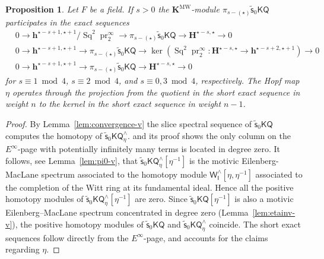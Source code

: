 \documentclass[11pt,hyp,english]{article}
\newcommand{\KQ}{\mathsf{KQ}}
\newcommand{\Sq}{\operatorname{Sq}}
\newcommand{\pr}{\operatorname{pr}}
\newcommand{\vs}{\tilde{\mathsf{s}}}
\newcommand{\KMW}{\mathbf{K}^\mathrm{MW}}
\newcommand{\bideg}{(\star)}
\newtheorem{proposition}[theorem]{Proposition}
\theoremstyle{definition}
\begin{document}
\begin{proposition}\label{thm:pi-v}
Let $F$ be a field.
If $s>0$ the $\KMW$-module $\pi_{s-\bideg}\vs_{0}\KQ $ participates in the exact sequences
\begin{align*}
& 0 \to \mathbf{h}^{\star-s+1,\star+1}/\Sq^2\pr^\infty_2 \to 
\pi_{s-\bideg}\vs_{0}\KQ  \to \mathbf{H}^{\star-s,\star} \to 0 \\
& 0 \to \mathbf{h}^{\star-s+1,\star+1} \to 
\pi_{s-\bideg}\vs_{0}\KQ  \to 
\ker(\Sq^2\pr^\infty_2:\mathbf{H}^{\star-s,\star}\to \mathbf{h}^{\star-s+2,\star+1}) \to 0 \\
& 0 \to \mathbf{h}^{\star-s+1,\star+1} \to 
\pi_{s-\bideg}\vs_{0}\KQ  \to \mathbf{H}^{\star-s,\star} \to 0 
\end{align*}
for $s \equiv 1 \bmod 4$, $s \equiv 2 \bmod 4$, and $s \equiv 0,3 \bmod 4$, 
respectively. 
The Hopf map $\eta$ operates through the projection from the quotient in the short 
exact sequence in weight $n$ to the kernel in the short exact sequence in weight $n-1$.
\end{proposition} 

\begin{proof}
By Lemma~\ref{lem:convergence-v} the slice spectral sequence of $\vs_{0}\KQ $ computes the homotopy of $\vs_{0}\KQ ^\wedge_\eta$. 
 and its proof shows the only column on the $E^\infty$-page with potentially infinitely many terms is located in degree zero.
It follows, see Lemma~\ref{lem:pi0-v}, that $\vs_{0}\KQ ^\wedge_\eta[\eta^{-1}]$ is the motivic Eilenberg-MacLane spectrum associated to the homotopy module $\mathsf{W}^\wedge_{\mathsf{I}}[\eta,\eta^{-1}]$ associated to the completion of the Witt ring at its fundamental ideal.
Hence all the positive homotopy modules of $\vs_{0}\KQ ^\wedge_\eta[\eta^{-1}]$ are zero.
Since $\vs_{0}\KQ[\eta^{-1}]$ is also a motivic Eilenberg–MacLane spectrum concentrated in degree zero (Lemma~\ref{lem:etainv-v}), the positive homotopy modules of $\vs_{0}\KQ$ and $\vs_{0}\KQ^\wedge_\eta$ coincide. The short exact sequences follow directly from the $E^\infty$-page, and  accounts for the claims regarding $\eta$.
\end{proof}
\end{document}
